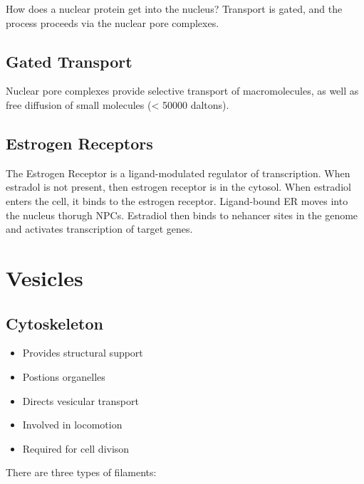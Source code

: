 \documentclass[11pt]{scrartcl}
\begin{document}
How does a nuclear protein get into the nucleus? Transport is gated, and the process proceeds via the nuclear pore complexes.

\subsection{Gated Transport}

Nuclear pore complexes provide selective transport of macromolecules,
as well as free diffusion of small molecules (< 50000 daltons).




\subsection{Estrogen Receptors}

The Estrogen Receptor is a ligand-modulated regulator of
transcription. When estradol is not present, then estrogen receptor is
in the cytosol.  When estradiol enters the cell, it binds to the
estrogen receptor. Ligand-bound ER moves into the nucleus thorugh
NPCs. Estradiol then binds to nehancer sites in the genome and
activates transcription of target genes.

\section{Vesicles}

\subsection{Cytoskeleton}

\begin{itemize}
\item Provides structural support
\item Postions organelles
\item Directs vesicular transport
\item Involved in locomotion
\item Required for cell divison
\end{itemize}

There are three types of filaments:
\end{document}
